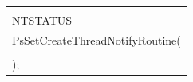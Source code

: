  \begin{table}[b]\small %


\begin{center}










\tabcolsep=9pt


\begin{tabular}{|l|}


\hline


\\[-9pt]


{\sf NTSTATUS} \\


{\sf PsSetCreateThreadNotifyRoutine}(\\


\hspace*{5mm}{\sf IN PCREATE\_THREAD\_NOTIFY\_ROUTINE NotifyRoutine}\\


);\\


\hline


\end{tabular}





\vspace*{-3pt}





\parbox{286pt}{


}


\end{center}


\vspace*{3pt}






  \begin{center}











\end{center}
\end{table}
